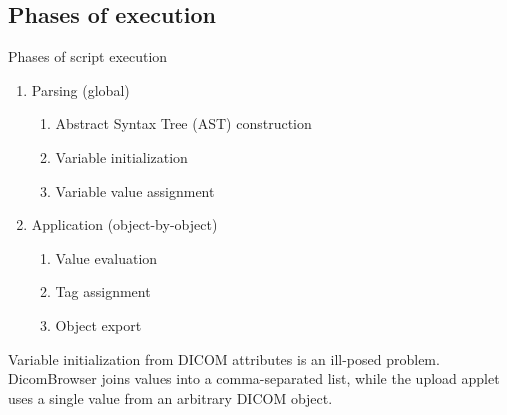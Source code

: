 \documentclass[handout]{beamer}
\begin{document}
\subsection{Phases of execution}
\begin{frame}[fragile]{Phases of script execution}
\begin{enumerate}
\item Parsing (global)
  \begin{enumerate}[i]
    \pause
    \item Abstract Syntax Tree (AST) construction
    \pause
    \item Variable initialization
    \pause
    \item Variable value assignment
  \end{enumerate}
\pause
\item Application (object-by-object)
  \begin{enumerate}[i]
    \pause
    \item Value evaluation
    \pause
    \item Tag assignment
    \pause
    \item Object export
  \end{enumerate}
\end{enumerate}

\pause
Variable initialization from DICOM attributes is an ill-posed
problem. DicomBrowser joins values into a comma-separated list, while
the upload applet uses a single value from an arbitrary DICOM object.

\end{frame}
\end{document}
